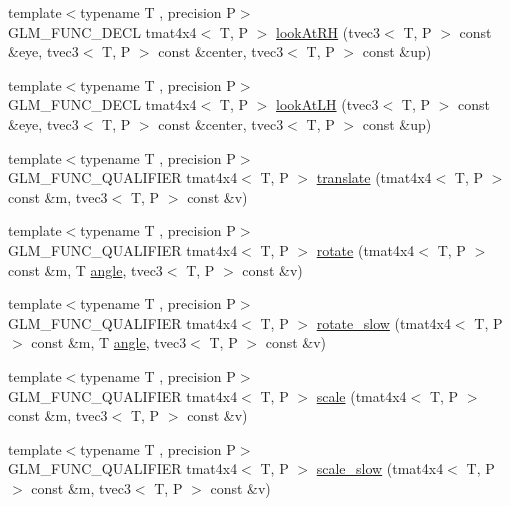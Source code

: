 \begin{DoxyCompactItemize}
\item 
{\footnotesize template$<$typename T , precision P$>$ }\\G\+L\+M\+\_\+\+F\+U\+N\+C\+\_\+\+D\+E\+C\+L tmat4x4$<$ T, P $>$ \hyperlink{group__gtc__matrix__transform_ga2876d9313334980b94292d2ec169088e}{look\+At\+R\+H} (tvec3$<$ T, P $>$ const \&eye, tvec3$<$ T, P $>$ const \&center, tvec3$<$ T, P $>$ const \&up)
\item 
{\footnotesize template$<$typename T , precision P$>$ }\\G\+L\+M\+\_\+\+F\+U\+N\+C\+\_\+\+D\+E\+C\+L tmat4x4$<$ T, P $>$ \hyperlink{group__gtc__matrix__transform_gacd0c077ec7b58a575855e29cb5fb586d}{look\+At\+L\+H} (tvec3$<$ T, P $>$ const \&eye, tvec3$<$ T, P $>$ const \&center, tvec3$<$ T, P $>$ const \&up)
\item 
{\footnotesize template$<$typename T , precision P$>$ }\\G\+L\+M\+\_\+\+F\+U\+N\+C\+\_\+\+Q\+U\+A\+L\+I\+F\+I\+E\+R tmat4x4$<$ T, P $>$ \hyperlink{group__gtc__matrix__transform_gaee134ab77c6c5548a6ebf4e8e476c6ed}{translate} (tmat4x4$<$ T, P $>$ const \&m, tvec3$<$ T, P $>$ const \&v)
\item 
{\footnotesize template$<$typename T , precision P$>$ }\\G\+L\+M\+\_\+\+F\+U\+N\+C\+\_\+\+Q\+U\+A\+L\+I\+F\+I\+E\+R tmat4x4$<$ T, P $>$ \hyperlink{group__gtc__matrix__transform_ga161b1df124348f232d994ba7958e4815}{rotate} (tmat4x4$<$ T, P $>$ const \&m, T \hyperlink{group__gtc__quaternion_gad4a4448baedb198b2b1e7880d2544dc9}{angle}, tvec3$<$ T, P $>$ const \&v)
\item 
{\footnotesize template$<$typename T , precision P$>$ }\\G\+L\+M\+\_\+\+F\+U\+N\+C\+\_\+\+Q\+U\+A\+L\+I\+F\+I\+E\+R tmat4x4$<$ T, P $>$ \hyperlink{namespaceglm_a9fbbd196726ba74b00b82b9a3d48487f}{rotate\+\_\+slow} (tmat4x4$<$ T, P $>$ const \&m, T \hyperlink{group__gtc__quaternion_gad4a4448baedb198b2b1e7880d2544dc9}{angle}, tvec3$<$ T, P $>$ const \&v)
\item 
{\footnotesize template$<$typename T , precision P$>$ }\\G\+L\+M\+\_\+\+F\+U\+N\+C\+\_\+\+Q\+U\+A\+L\+I\+F\+I\+E\+R tmat4x4$<$ T, P $>$ \hyperlink{group__gtc__matrix__transform_ga8f062fcc07e2445500793f2803afebb0}{scale} (tmat4x4$<$ T, P $>$ const \&m, tvec3$<$ T, P $>$ const \&v)
\item 
{\footnotesize template$<$typename T , precision P$>$ }\\G\+L\+M\+\_\+\+F\+U\+N\+C\+\_\+\+Q\+U\+A\+L\+I\+F\+I\+E\+R tmat4x4$<$ T, P $>$ \hyperlink{namespaceglm_afae64498e6edd7aa501c1a7fa071f779}{scale\+\_\+slow} (tmat4x4$<$ T, P $>$ const \&m, tvec3$<$ T, P $>$ const \&v)

\end{DoxyCompactItemize}
